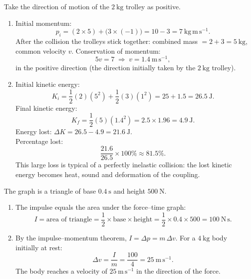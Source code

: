 \documentclass[11pt]{article}
\begin{document}
\begin{corrige}
Take the direction of motion of the $2\ \mathrm{kg}$ trolley as positive.
\begin{enumerate}
\item Initial momentum:
\[ p_i = (2 \times 5) + \bigl(3 \times (-1)\bigr) = 10 - 3 = 7\ \mathrm{kg\,m\,s^{-1}}. \]
After the collision the trolleys stick together: combined mass $= 2+3 = 5\ \mathrm{kg}$, common velocity $v$. Conservation of momentum:
\[ 5v = 7 \;\Rightarrow\; v = 1.4\ \mathrm{m\,s^{-1}}, \]
in the positive direction (the direction initially taken by the $2\ \mathrm{kg}$ trolley).

\item Initial kinetic energy:
\[ K_i = \frac{1}{2}(2)(5^2) + \frac{1}{2}(3)(1^2) = 25 + 1.5 = 26.5\ \mathrm{J}. \]
Final kinetic energy:
\[ K_f = \frac{1}{2}(5)(1.4^2) = 2.5 \times 1.96 = 4.9\ \mathrm{J}. \]
Energy lost: $\Delta K = 26.5 - 4.9 = 21.6\ \mathrm{J}$. \\
Percentage lost:
\[ \frac{21.6}{26.5} \times 100\% \approx 81.5\%. \]
This large loss is typical of a perfectly inelastic collision: the lost kinetic energy becomes heat, sound and deformation of the coupling.
\end{enumerate}
\end{corrige}

\begin{corrige}
The graph is a triangle of base $0.4\ \mathrm{s}$ and height $500\ \mathrm{N}$.
\begin{enumerate}
\item The impulse equals the area under the force–time graph:
\[ I = \text{area of triangle} = \frac{1}{2} \times \text{base} \times \text{height} = \frac{1}{2} \times 0.4 \times 500 = 100\ \mathrm{N\,s}. \]

\item By the impulse–momentum theorem, $I = \Delta p = m\,\Delta v$. For a $4\ \mathrm{kg}$ body initially at rest:
\[ \Delta v = \frac{I}{m} = \frac{100}{4} = 25\ \mathrm{m\,s^{-1}}. \]
The body reaches a velocity of $25\ \mathrm{m\,s^{-1}}$ in the direction of the force.
\end{enumerate}
\end{corrige}
\end{document}
